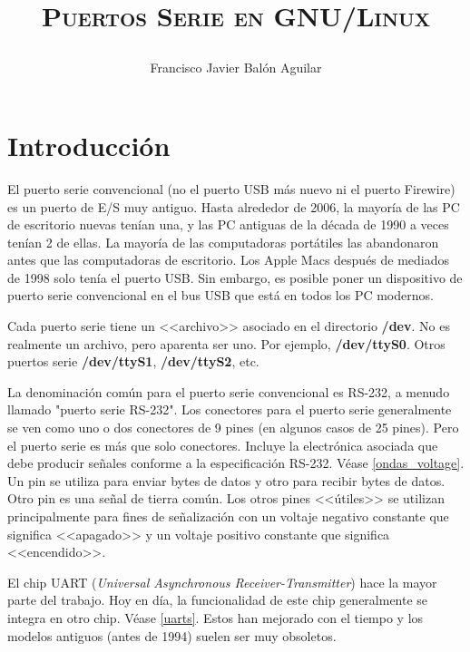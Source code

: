 \documentclass[11pt, twosides, titlepage]{article}
\title{{\scshape\Huge Puertos Serie en GNU/Linux\par}}
\author{Francisco Javier Balón Aguilar}
\begin{document}
\maketitle
\renewcommand{\contentsname}{Índice de contenidos} %
\tableofcontents %
\newpage

\listoffigures
\newpage

\listoftables
\newpage

\section{Introducción}

    El puerto serie convencional (no el puerto USB más nuevo ni el puerto Firewire) es un 
    puerto de E/S muy antiguo. Hasta alrededor de 2006, la mayoría de las PC de escritorio 
    nuevas tenían una, y las PC antiguas de la década de 1990 a veces tenían 2 de ellas. 
    La mayoría de las computadoras portátiles las abandonaron antes que las computadoras 
    de escritorio. Los Apple Macs después de mediados de 1998 solo tenía el puerto 
    USB. Sin embargo, es posible poner un dispositivo de puerto serie convencional en el 
    bus USB que está en todos los PC modernos.

    Cada puerto serie tiene un <<archivo>> asociado en el directorio \textbf{/dev}. No es 
    realmente un archivo, pero aparenta ser uno. Por ejemplo, \textbf{/dev/ttyS0}. Otros 
    puertos serie \textbf{/dev/ttyS1}, \textbf{/dev/ttyS2}, etc. 

    La denominación común para el puerto serie convencional es RS-232, a menudo 
    llamado "puerto serie RS-232". Los conectores para el puerto serie generalmente se ven 
    como uno o dos conectores de 9 pines (en algunos casos de 25 pines). Pero el puerto 
    serie es más que solo conectores. Incluye la electrónica asociada que debe producir 
    señales conforme a la especificación RS-232. Véase \ref{ondas_voltage}. Un pin se 
    utiliza para enviar bytes de datos y otro para recibir bytes de datos. Otro pin es 
    una señal de tierra común. Los otros pines <<útiles>> se utilizan principalmente para 
    fines de señalización con un voltaje negativo constante que significa <<apagado>> y un 
    voltaje positivo constante que significa <<encendido>>.

    El chip UART (\textit{Universal Asynchronous Receiver-Transmitter}) hace la mayor parte 
    del trabajo. Hoy en día, la funcionalidad de este chip generalmente se integra en otro 
    chip. Véase \ref{uarts}. Estos han mejorado con el tiempo y los modelos antiguos (antes 
    de 1994) suelen ser muy obsoletos.
\end{document}
